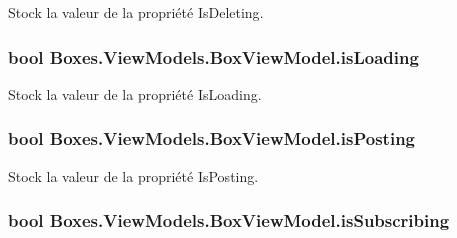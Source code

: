 Stock la valeur de la propriété {\ttfamily Is\+Deleting}. 

\subsubsection[{\texorpdfstring{is\+Loading}{isLoading}}]{\setlength{\rightskip}{0pt plus 5cm}bool Boxes.\+View\+Models.\+Box\+View\+Model.\+is\+Loading\hspace{0.3cm}{\ttfamily [private]}}\hypertarget{class_boxes_1_1_view_models_1_1_box_view_model_ac2ae5fd2e92a960fb7951ac7e1fe0005}{}\label{class_boxes_1_1_view_models_1_1_box_view_model_ac2ae5fd2e92a960fb7951ac7e1fe0005}


Stock la valeur de la propriété {\ttfamily Is\+Loading}. 

\subsubsection[{\texorpdfstring{is\+Posting}{isPosting}}]{\setlength{\rightskip}{0pt plus 5cm}bool Boxes.\+View\+Models.\+Box\+View\+Model.\+is\+Posting\hspace{0.3cm}{\ttfamily [private]}}\hypertarget{class_boxes_1_1_view_models_1_1_box_view_model_a909bf513a4480f468fdf9d6212c99104}{}\label{class_boxes_1_1_view_models_1_1_box_view_model_a909bf513a4480f468fdf9d6212c99104}


Stock la valeur de la propriété {\ttfamily Is\+Posting}. 

\subsubsection[{\texorpdfstring{is\+Subscribing}{isSubscribing}}]{\setlength{\rightskip}{0pt plus 5cm}bool Boxes.\+View\+Models.\+Box\+View\+Model.\+is\+Subscribing\hspace{0.3cm}{\ttfamily [private]}}\hypertarget{class_boxes_1_1_view_models_1_1_box_view_model_ae865069cd94b77fedbc7cb8e220e3dda}{}\label{class_boxes_1_1_view_models_1_1_box_view_model_ae865069cd94b77fedbc7cb8e220e3dda}


